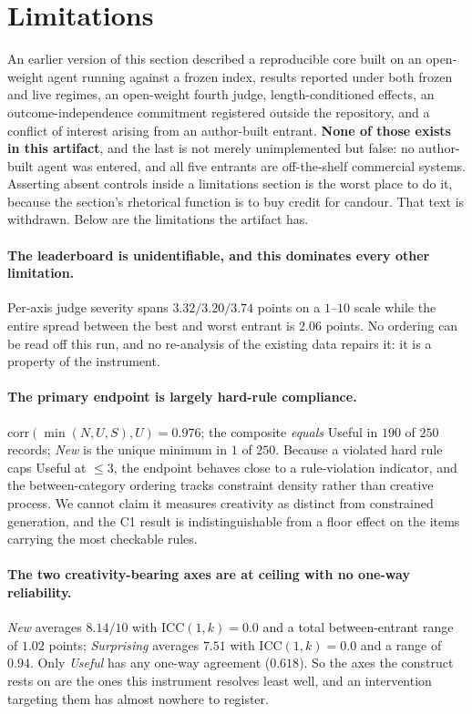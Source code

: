 \section{Limitations}
\label{sec:limitations}

An earlier version of this section described a reproducible core built on an open-weight agent
running against a frozen index, results reported under both frozen and live regimes, an open-weight
fourth judge, length-conditioned effects, an outcome-independence commitment registered outside the
repository, and a conflict of interest arising from an author-built entrant. \textbf{None of those
exists in this artifact}, and the last is not merely unimplemented but false: no author-built agent
was entered, and all five entrants are off-the-shelf commercial systems. Asserting absent controls
inside a limitations section is the worst place to do it, because the section's rhetorical function
is to buy credit for candour. That text is withdrawn. Below are the limitations the artifact has.

\paragraph{The leaderboard is unidentifiable, and this dominates every other limitation.} Per-axis
judge severity spans $3.32/3.20/3.74$ points on a $1$--$10$ scale while the entire spread between
the best and worst entrant is $2.06$ points. No ordering can be read off this run, and no
re-analysis of the existing data repairs it: it is a property of the instrument.

\paragraph{The primary endpoint is largely hard-rule compliance.} $\mathrm{corr}(\min(N,U,S),U) =
0.976$; the composite \emph{equals} Useful in $190$ of $250$ records; \emph{New} is the unique
minimum in $1$ of $250$. Because a violated hard rule caps Useful at ${\leq}3$, the endpoint behaves
close to a rule-violation indicator, and the between-category ordering tracks constraint density
rather than creative process. We cannot claim it measures creativity as distinct from constrained
generation, and the C1 result is indistinguishable from a floor effect on the items carrying the
most checkable rules.

\paragraph{The two creativity-bearing axes are at ceiling with no one-way reliability.} \emph{New}
averages $8.14/10$ with $\mathrm{ICC}(1,k)=0.0$ and a total between-entrant range of $1.02$ points;
\emph{Surprising} averages $7.51$ with $\mathrm{ICC}(1,k)=0.0$ and a range of $0.94$. Only
\emph{Useful} has any one-way agreement ($0.618$). So the axes the construct rests on are the ones
this instrument resolves least well, and an intervention targeting them has almost nowhere to
register.

